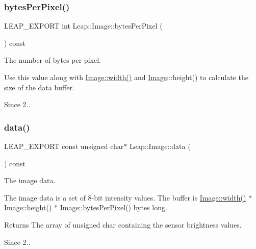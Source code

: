 \subsubsection{\texorpdfstring{bytes\+Per\+Pixel()}{bytesPerPixel()}}
{\footnotesize\ttfamily L\+E\+A\+P\+\_\+\+E\+X\+P\+O\+RT int Leap\+::\+Image\+::bytes\+Per\+Pixel (\begin{DoxyParamCaption}{ }\end{DoxyParamCaption}) const}

The number of bytes per pixel.

Use this value along with {\ttfamily \hyperlink{class_leap_1_1_image_adfca7fee0ab396da733d084946e1de0f}{Image\+::width()}} and {\ttfamily \hyperlink{class_leap_1_1_image}{Image}\+:\+::height()} to calculate the size of the data buffer.


\begin{DoxyCodeInclude}
\end{DoxyCodeInclude}


\begin{DoxySince}{Since}
2.. 
\end{DoxySince}
\mbox{\label{class_leap_1_1_image_ab5226d1ec47ce8a4bcebee7783112d22}} 
\subsubsection{\texorpdfstring{data()}{data()}}
{\footnotesize\ttfamily L\+E\+A\+P\+\_\+\+E\+X\+P\+O\+RT const unsigned char$\ast$ Leap\+::\+Image\+::data (\begin{DoxyParamCaption}{ }\end{DoxyParamCaption}) const}

The image data.

The image data is a set of 8-\/bit intensity values. The buffer is {\ttfamily \hyperlink{class_leap_1_1_image_adfca7fee0ab396da733d084946e1de0f}{Image\+::width()} $\ast$ \hyperlink{class_leap_1_1_image_aa0715444f45580442c65f707eacc77a9}{Image\+::height()} $\ast$ \hyperlink{class_leap_1_1_image_aa4a51ac912a8f4676b8b60c3119f0dba}{Image\+::bytes\+Per\+Pixel()}} bytes long.


\begin{DoxyCodeInclude}
\end{DoxyCodeInclude}


\begin{DoxyReturn}{Returns}
The array of unsigned char containing the sensor brightness values. 
\end{DoxyReturn}
\begin{DoxySince}{Since}
2.. 
\end{DoxySince}
\mbox{\label{class_leap_1_1_image_ab36f9b712f7680c8fd8ae480655140bb}} 
